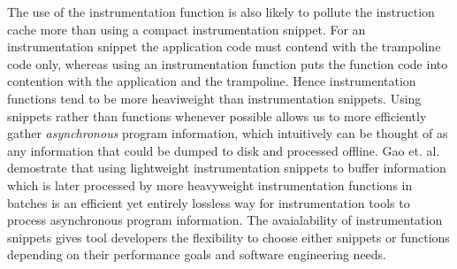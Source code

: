 The use of the instrumentation function is also likely to pollute the instruction cache more than using a compact
instrumentation snippet. For an instrumentation snippet the application code must contend with the trampoline code
only, whereas using an instrumentation function puts the function code into contention with the application and the
trampoline. Hence 
instrumentation functions tend to be more heaviweight than instrumentation snippets. Using snippets rather than functions 
whenever possible allows us to more efficiently gather 
\textit{asynchronous} program information, which intuitively can be thought of as any information that could be dumped to
disk and processed offline. Gao et. al. \cite{gao2005aliter} demostrate that using lightweight instrumentation snippets 
to buffer information which is later processed by more heavyweight instrumentation functions in batches is an efficient
yet entirely lossless way for instrumentation tools to process asynchronous program information. The avaialability of instrumentation 
snippets gives tool developers the flexibility to choose either snippets or functions
depending on their performance goals and software engineering needs.
